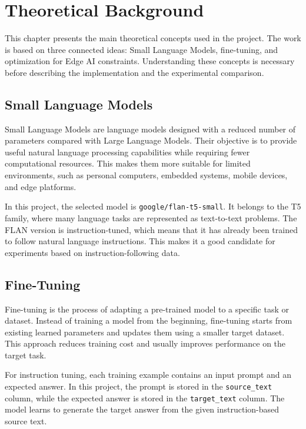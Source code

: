 \chapter{Theoretical Background}

\vspace*{0.3cm}

This chapter presents the main theoretical concepts used in the project. The work
is based on three connected ideas: Small Language Models, fine-tuning, and
optimization for Edge AI constraints. Understanding these concepts is necessary
before describing the implementation and the experimental comparison.

\section{Small Language Models}

Small Language Models are language models designed with a reduced number of
parameters compared with Large Language Models. Their objective is to provide
useful natural language processing capabilities while requiring fewer
computational resources. This makes them more suitable for limited environments,
such as personal computers, embedded systems, mobile devices, and edge platforms.

\vspace*{0.15cm}

In this project, the selected model is \texttt{google/flan-t5-small}. It belongs
to the T5 family, where many language tasks are represented as text-to-text
problems. The FLAN version is instruction-tuned, which means that it has already
been trained to follow natural language instructions. This makes it a good
candidate for experiments based on instruction-following data.

\section{Fine-Tuning}

Fine-tuning is the process of adapting a pre-trained model to a specific task or
dataset. Instead of training a model from the beginning, fine-tuning starts from
existing learned parameters and updates them using a smaller target dataset. This
approach reduces training cost and usually improves performance on the target
task.

\vspace*{0.15cm}

For instruction tuning, each training example contains an input prompt and an
expected answer. In this project, the prompt is stored in the \texttt{source\_text}
column, while the expected answer is stored in the \texttt{target\_text} column.
The model learns to generate the target answer from the given instruction-based
source text.

